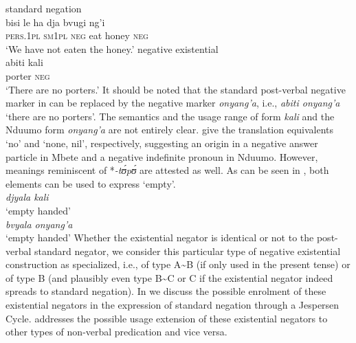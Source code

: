 \documentclass[output=paper]{langsci/langscibook}
\begin{document}
\ea\label{ex:mbete-honey-porter}  \ea standard negation\\ \gll bisi le ha dja bvugi ng'i\\
\textsc{pers.1pl} \textsc{sm1pl} \textsc{neg} eat honey \textsc{neg}\\ \glt
`We have not eaten the honey.' \ex negative existential\\ \gll abiti kali\\
porter \textsc{neg}\\ \glt 	`There are no porters.' \z\z It should be noted
that the  standard post-verbal negative marker in
 can be replaced by the negative marker
\textit{onyang'a}, i.e., \textit{abiti onyang'a} `there are no porters'.
The semantics and the usage range of  form \textit{kali} and the
Nduumo form \textit{onyang'a} are not entirely clear. \citet[114,
171]{BitonAdam1969} give the translation equivalents `no' and `none, nil',
respectively, suggesting an origin in a negative answer particle in Mbete
and a negative indefinite pronoun in Nduumo. However, meanings reminiscent
of *\textit{-t{\'ʊ}p{\'ʊ}} are attested as well. As can be seen in
, both elements can be used to express `empty'.
\ea\label{ex:mbete-nduumo-empty} 
\ea{}\\ 
\textit{djyala kali}\\ 
\glt `empty handed'
\ex{}\\ 
\textit{bvyala onyang'a}\\ 
\glt `empty handed' \z\z 
%
Whether the existential negator is identical or
not to the post-verbal standard negator, we consider this particular type
of negative existential construction as specialized, i.e., of type
A{\textasciitilde}B (if only used in the present tense) or of type B (and
plausibly even type B{\textasciitilde}C or C if the existential negator
indeed spreads to standard negation). In  we discuss the
possible enrolment of these existential negators in the expression of
standard negation through a Jespersen Cycle.  addresses
the possible usage extension of these existential negators to other types
of non-verbal predication and vice versa.
\end{document}
